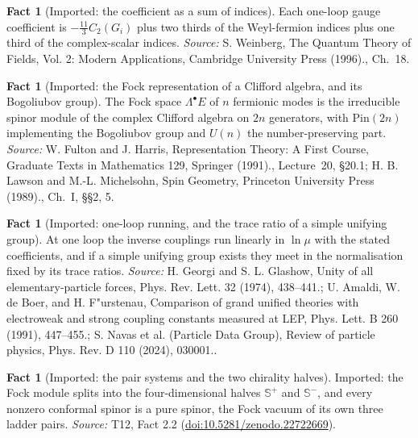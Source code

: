 \documentclass[11pt]{article}
\theoremstyle{definition}
\newtheorem{fact}[theorem]{Fact}
\theoremstyle{plain}
\providecommand{\CS}{}\renewcommand{\CS}{{\mathbb{S}^{+}}}
\providecommand{\CSm}{}\renewcommand{\CSm}{{\mathbb{S}^{-}}}
\begin{document}
\begin{fact}[Imported: the coefficient as a sum of indices]\label{c:standard-model.imported-coefficient-sum-indices}
Each one-loop gauge coefficient is $-\tfrac{11}{3}C_{2}(G_{i})$ plus two thirds of the Weyl-fermion indices plus one third of the complex-scalar indices.
\emph{Source:} S. Weinberg, The Quantum Theory of Fields, Vol. 2: Modern Applications, Cambridge University Press (1996)., Ch.~18.
\end{fact}

\begin{fact}[Imported: the Fock representation of a Clifford algebra, and its Bogoliubov group]\label{c:standard-model.imported-fock-representation-clifford-algebra-bogoliubov}
The Fock space $\Lambda^{\bullet}E$ of $n$ fermionic modes is the irreducible spinor module of the complex Clifford algebra on $2n$ generators, with $\mathrm{Pin}(2n)$ implementing the Bogoliubov group and $U(n)$ the number-preserving part.
\emph{Source:} W. Fulton and J. Harris, Representation Theory: A First Course, Graduate Texts in Mathematics 129, Springer (1991)., Lecture~20, \S 20.1; H. B. Lawson and M.-L. Michelsohn, Spin Geometry, Princeton University Press (1989)., Ch.~I, \S\S 2, 5.
\end{fact}

\begin{fact}[Imported: one-loop running, and the trace ratio of a simple unifying group]\label{c:standard-model.imported-one-loop-running-trace-ratio}
At one loop the inverse couplings run linearly in $\ln\mu$ with the stated coefficients, and if a simple unifying group exists they meet in the normalisation fixed by its trace ratios.
\emph{Source:} H. Georgi and S. L. Glashow, Unity of all elementary-particle forces, Phys. Rev. Lett. 32 (1974), 438--441.; U. Amaldi, W. de Boer, and H. F"urstenau, Comparison of grand unified theories with electroweak and strong coupling constants measured at LEP, Phys. Lett. B 260 (1991), 447--455.; S. Navas et al. (Particle Data Group), Review of particle physics, Phys. Rev. D 110 (2024), 030001..
\end{fact}

\begin{fact}[Imported: the pair systems and the two chirality halves]\label{c:standard-model.imported-pair-systems-two-chirality-halves}
Imported: the Fock module splits into the four-dimensional halves $\CS$ and $\CSm$, and every nonzero conformal spinor is a pure spinor, the Fock vacuum of its own three ladder pairs.
\emph{Source:} T12, Fact 2.2 (\href{https://doi.org/10.5281/zenodo.22722669}{doi:10.5281/zenodo.22722669}).
\end{fact}
\end{document}
